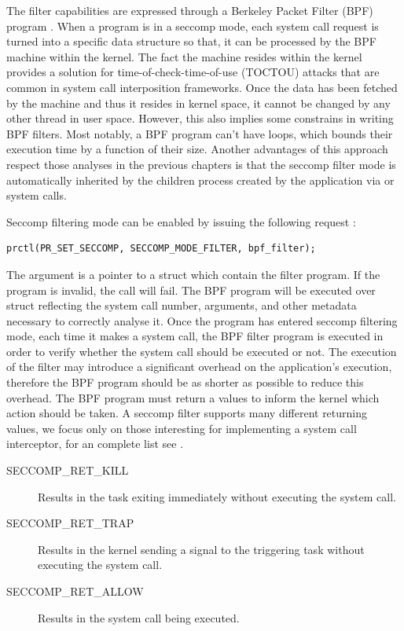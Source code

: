 The filter capabilities are expressed through a Berkeley Packet Filter (BPF) program \cite{bpf}. When a program is in a seccomp mode, each system call request is  turned into a specific data structure so that, it can be processed by the BPF machine within the kernel. The fact the machine resides within the kernel provides a solution for time-of-check-time-of-use (TOCTOU) attacks that are common in system call interposition frameworks. Once the data has been fetched by the machine and thus it resides in kernel space, it cannot be changed by any other thread in user space. However, this also implies some constrains in writing BPF filters. Most notably, a BPF program can't have loops, which bounds their execution time by a function of their size. Another advantages of this approach respect those analyses in the previous chapters is that the seccomp filter mode is automatically inherited by the children process created by the application via  or  system calls.

Seccomp filtering mode can be enabled by issuing the following request : 

\begin{center}
\lstset{escapechar=@,style=c}
\begin{lstlisting}[caption={Request for entering seccomp filtering mode}]
												prctl(PR_SET_SECCOMP, SECCOMP_MODE_FILTER, bpf_filter);
\end{lstlisting}
\end{center}

The  argument is a pointer to a struct  which contain the filter program.  If the program is invalid, the call will fail. The BPF program will be executed over struct  reflecting the system call number, arguments, and other metadata necessary to correctly analyse it. Once the program has entered seccomp filtering mode, each time it makes a system call, the BPF filter program is executed in order to verify whether the system call should be executed or not. The execution of the filter may introduce a significant overhead on the application's execution, therefore the BPF program should be as shorter as possible to reduce this overhead. The BPF program must return a values to inform the kernel which action should be taken. A seccomp filter supports many different returning values, we focus only on those interesting for implementing a system call interceptor, for an complete list see \cite{filtering}.  

\begin{description}
\item[SECCOMP\_RET\_KILL]  Results in the task exiting immediately without executing the system call. 
\item[SECCOMP\_RET\_TRAP]  Results in the kernel sending a  signal to the triggering task without executing the system call. 
\item[SECCOMP\_RET\_ALLOW] Results in the system call being executed.
\end{description}

